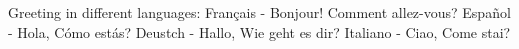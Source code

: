 \documentclass[12pt, a4paper]{article}
\begin{document}
	Greeting in different languages:
	Fran\c{c}ais - Bonjour! Comment allez-vous?
	Espa\~{n}ol - Hola, \textquestiondown C\'{o}mo est\'{a}s?
	Deustch - Hallo, Wie geht es dir?
	Italiano - Ciao, Come stai?
\end{document}
